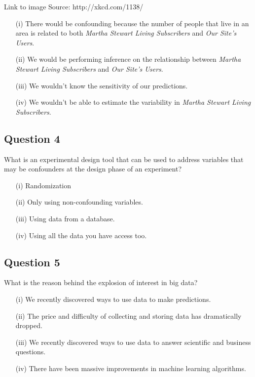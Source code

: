 \documentclass[12pt]{article}
\begin{document}
Link to image 
Source: http://xkcd.com/1138/
\begin{itemize}
\item[(i)] There would be confounding because the number of people that live in an area is related to both \textit{Martha Stewart Living Subscribers} and \textit{Our Site's Users}.
\item[(ii)] We would be performing inference on the relationship between \textit{Martha Stewart Living Subscribers} and \textit{Our Site's Users}.
\item[(iii)] We wouldn't know the sensitivity of our predictions.
\item[(iv)] We wouldn't be able to estimate the variability in \textit{Martha Stewart Living Subscribers}.
\end{itemize}
\subsection*{Question 4}
What is an experimental design tool that can be used to address variables that may be confounders at the design phase of an experiment?
\begin{itemize}
\item[(i)] Randomization
\item[(ii)] Only using non-confounding variables.
\item[(iii)] Using data from a database.
\item[(iv)] Using all the data you have access too.
\end{itemize}
\newpage
\subsection*{Question 5}
What is the reason behind the explosion of interest in big data?

\begin{itemize}
\item[(i)] We recently discovered ways to use data to make predictions.
\item[(ii)] The price and difficulty of collecting and storing data has dramatically dropped.
\item[(iii)] We recently discovered ways to use data to answer scientific and business questions.
\item[(iv)] There have been massive improvements in machine learning algorithms.
\end{itemize}
\end{document}
